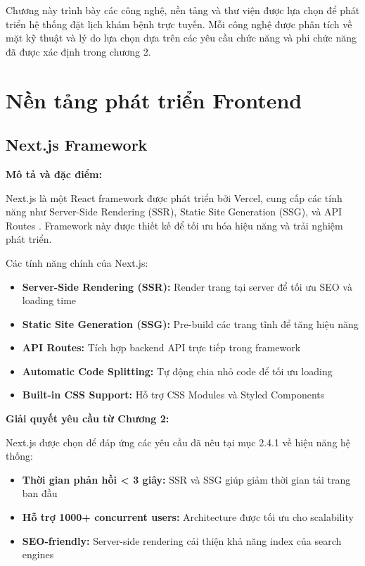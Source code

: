 \documentclass[../DoAn.tex]{subfiles}
\begin{document}
\label{chapter:3}

Chương này trình bày các công nghệ, nền tảng và thư viện được lựa chọn để phát triển hệ thống đặt lịch khám bệnh trực tuyến. Mỗi công nghệ được phân tích về mặt kỹ thuật và lý do lựa chọn dựa trên các yêu cầu chức năng và phi chức năng đã được xác định trong chương 2.

\section{Nền tảng phát triển Frontend}
\label{section:3.1}

\subsection{Next.js Framework}
\label{subsection:3.1.1}

\textbf{Mô tả và đặc điểm:}

Next.js là một React framework được phát triển bởi Vercel, cung cấp các tính năng như Server-Side Rendering (SSR), Static Site Generation (SSG), và API Routes \cite{nextjs}. Framework này được thiết kế để tối ưu hóa hiệu năng và trải nghiệm phát triển.

Các tính năng chính của Next.js:
\begin{itemize}
    \item \textbf{Server-Side Rendering (SSR):} Render trang tại server để tối ưu SEO và loading time
    \item \textbf{Static Site Generation (SSG):} Pre-build các trang tĩnh để tăng hiệu năng
    \item \textbf{API Routes:} Tích hợp backend API trực tiếp trong framework
    \item \textbf{Automatic Code Splitting:} Tự động chia nhỏ code để tối ưu loading
    \item \textbf{Built-in CSS Support:} Hỗ trợ CSS Modules và Styled Components
\end{itemize}

\textbf{Giải quyết yêu cầu từ Chương 2:}

Next.js được chọn để đáp ứng các yêu cầu đã nêu tại mục 2.4.1 về hiệu năng hệ thống:
\begin{itemize}
    \item \textbf{Thời gian phản hồi < 3 giây:} SSR và SSG giúp giảm thời gian tải trang ban đầu
    \item \textbf{Hỗ trợ 1000+ concurrent users:} Architecture được tối ưu cho scalability
    \item \textbf{SEO-friendly:} Server-side rendering cải thiện khả năng index của search engines
\end{itemize}
\end{document}
